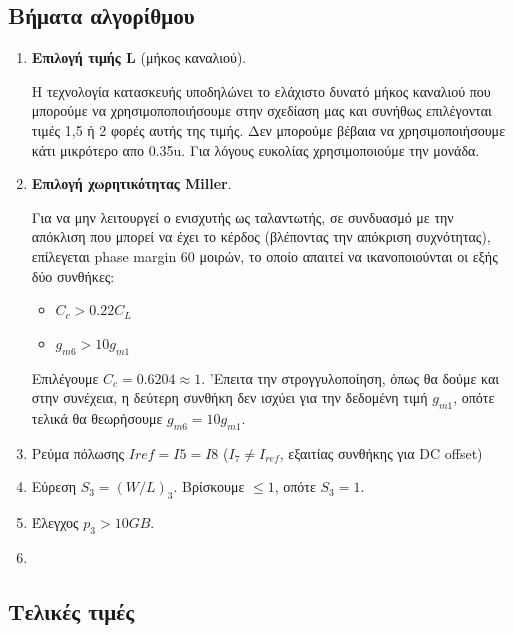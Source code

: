\documentclass[12pt, a4paper]{article}
\begin{document}
\subsection{Βήματα αλγορίθμου}    
\begin{enumerate}

    \item \textbf{Επιλογή τιμής L} (μήκος καναλιού). 
    
    Η τεχνολογία κατασκευής υποδηλώνει το ελάχιστο δυνατό μήκος καναλιού που μπορούμε να χρησιμοποποιήσουμε στην σχεδίαση μας και συνήθως επιλέγονται τιμές 1,5 ή 2 φορές αυτής της τιμής. Δεν μπορούμε βέβαια να χρησιμοποιήσουμε κάτι μικρότερο απο 0.35u. Για λόγους ευκολίας χρησιμοποιούμε την μονάδα.
    
    
    \item \textbf{Eπιλογή χωρητικότητας Miller}.
    
    Για να μην λειτουργεί ο ενισχυτής ως ταλαντωτής, σε συνδυασμό με την απόκλιση που μπορεί να έχει το κέρδος (βλέποντας την απόκριση συχνότητας), επίλεγεται phase margin 60 μοιρών, το οποίο απαιτεί να ικανοποιούνται οι εξής δύο συνθήκες: 
    \begin{itemize}
        \item $C_c > 0.22C_L$
        \item $g_{m6} > 10g_{m1}$
    \end{itemize}
    
    
    Επιλέγουμε $C_c = 0.6204\approx1$. 'Επειτα την στρογγυλοποίηση, όπως θα δούμε και στην συνέχεια, η δεύτερη συνθήκη δεν ισχύει για την δεδομένη τιμή $g_{m1}$, οπότε τελικά θα θεωρήσουμε $g_{m6} = 10g_{m1}$.
    
    \item Ρεύμα πόλωσης $Iref = I5 = I8$ ($I_7 \neq I_{ref}$, εξαιτίας συνθήκης για DC offset)
    
    \item Εύρεση $S_3 = (W/L)_3$. Βρίσκουμε $\leq1$, οπότε $S_3 = 1$.
    
    \item Έλεγχος $p_3 > 10 GB$.
    
    \item
\end{enumerate}

\subsection{Τελικές τιμές}
\end{document}
